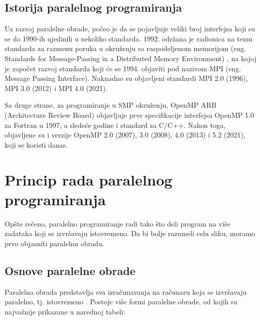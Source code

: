 \documentclass[a4paper]{article}
\begin{document}
{	\subsection{Istorija paralelnog programiranja}
	Uz razvoj paralelne obrade, počeo je da se pojavljuje veliki broj interfejsa koji su se do 1990-ih ujedinili u nekoliko standarda. 1992. održana je radionica na temu standarda za razmenu poruka u okruženju sa raspodeljenom memorijom (eng. Standards for Message-Passing in a Distributed Memory Environment) \cite{standardsformessagepassing}, na kojoj je započet razvoj standarda koji će se 1994. objaviti pod nazivom MPI (eng. Message Passing Interface). Naknadno su objavljeni standardi MPI 2.0 (1996), MPI 3.0 (2012) i MPI 4.0 (2021)\cite{mpidocs}.\par
	Sa druge strane, za programiranje u SMP okruženju, OpenMP ARB (Architecture Review Board) objavljuje prve specifikacije interfejsa OpenMP 1.0 za Fortran u 1997, a sledeće godine i standard za C/C++. Nakon toga, objavljene su i verzije OpenMP 2.0 (2007), 3.0 (2008), 4.0 (2013) i 5.2 (2021), koji se koristi danas\cite{opemp5}.
	
	\section{Princip rada paralelnog programiranja}
	Opšte rečeno, paralelno programiranje radi tako što deli program na više zadataka koji se izvršavaju istovremeno. Da bi bolje razumeli celu sliku, moramo prvo objasniti paralelnu obradu.
	\subsection{Osnove paralelne obrade}
	Paralelna obrada predstavlja sva izračunavanja na računaru koja se izvršavaju paralelno, tj. istovremeno \cite{p98}. Postoje više formi paralelne obrade, od kojih su najvažnije prikazane u narednoj tabeli:\\

}
\end{document}

